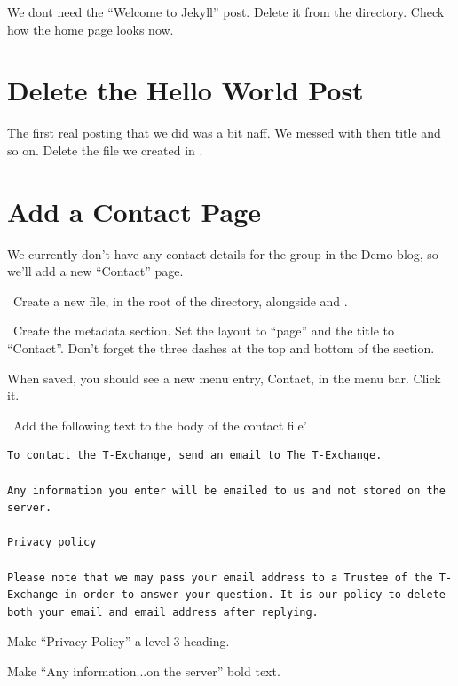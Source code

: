 We dont need the ``Welcome to Jekyll'' post. Delete it from the  directory. Check how the home page looks now.

\section{Delete the Hello World Post}

The first real posting that we did was a bit naff. We messed with then title and so on. Delete the file we created in .


\section{Add a Contact Page}

We currently don't have any contact details for the group in the Demo blog, so we'll add a new ``Contact'' page.

\lyxarrow{}~Create a new file,  in the root of the  directory, alongside  and .

\lyxarrow{}~Create the metadata section. Set the layout to ``page'' and the title to ``Contact''. Don't forget the three dashes at the top and bottom of the section.

When saved, you should see a new menu entry, Contact, in the menu bar. Click it.

\lyxarrow{}~Add the following text to the body of the contact file'

\begin{lstlisting}[style=myText]
To contact the T-Exchange, send an email to The T-Exchange.

Any information you enter will be emailed to us and not stored on the server.

Privacy policy

Please note that we may pass your email address to a Trustee of the T-Exchange in order to answer your question. It is our policy to delete both your email and email address after replying.
\end{lstlisting}

\hspace{\parindent}Make ``Privacy Policy'' a level 3 heading.

\hspace{\parindent}Make ``Any information...on the server'' bold text.

